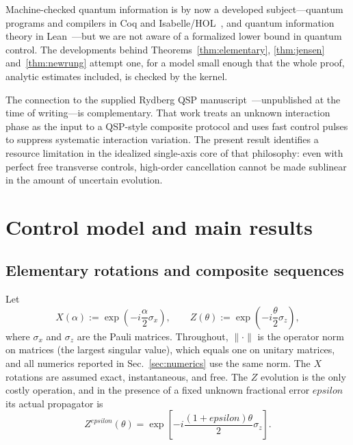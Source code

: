 \documentclass[%
  aps,
  pra,
  preprint,
  superscriptaddress,
  amsmath,amssymb,
  nofootinbib,
  floatfix,
]{revtex4-2}
\def\eps{epsilon}\def\C{C}\def\R{R}\def\lean#1{#1}\def\mathrm#1{#1}%
\theoremstyle{definition}
\theoremstyle{remark}
\newcommand{\C}{\mathbb C}
\newcommand{\R}{\mathbb R}
\newcommand{\eps}{\varepsilon}
\DeclareRobustCommand{\lean}[1]{\path{#1}}
\begin{document}
Machine-checked quantum information is by now a developed subject---quantum programs and
compilers in Coq and Isabelle/HOL~\cite{Bordg2021}, and quantum information theory in
Lean~\cite{Meiburg2025}---but we are not aware of a formalized lower bound in quantum control.
The developments behind Theorems~\ref{thm:elementary}, \ref{thm:jensen}
and~\ref{thm:newrung} attempt one, for a model small enough that the whole proof, analytic
estimates included, is checked by the kernel.

The connection to the supplied Rydberg QSP manuscript~\cite{Ye2026}---unpublished at the time
of writing---is complementary. That work treats an unknown interaction phase as the input to a
QSP-style composite protocol and uses fast control pulses to suppress systematic interaction
variation. The present result identifies a resource limitation in the idealized single-axis
core of that philosophy: even with perfect free transverse controls, high-order cancellation
cannot be made sublinear in the amount of uncertain evolution.

\section{Control model and main results}
\label{sec:model}

\subsection{Elementary rotations and composite sequences}

Let
\begin{equation}
X(\alpha):=\exp\!\left(-\mathrm{i}\frac{\alpha}{2}\sigma_x\right),
\qquad
Z(\theta):=\exp\!\left(-\mathrm{i}\frac{\theta}{2}\sigma_z\right),
\label{eq:rotations}
\end{equation}
where $\sigma_x$ and $\sigma_z$ are the Pauli matrices. Throughout, $\lVert\cdot\rVert$ is the
operator norm on matrices (the largest singular value), which equals one on unitary matrices, and
all numerics reported in Sec.~\ref{sec:numerics} use the same norm. The $X$ rotations are assumed exact,
instantaneous, and free. The $Z$ evolution is the only costly operation, and in the presence of a
fixed unknown fractional error $\eps$ its actual propagator is
\begin{equation}
Z^{\eps}(\theta)
=\exp\!\left[-\mathrm{i}\frac{(1+\eps)\theta}{2}\sigma_z\right].
\label{eq:imperfectZ}
\end{equation}
\end{document}
